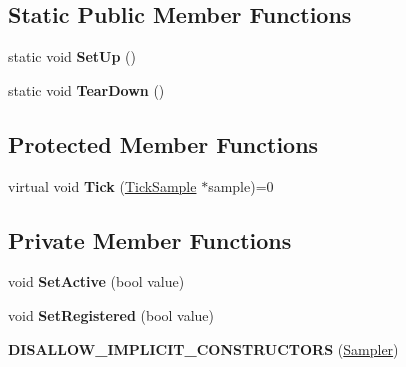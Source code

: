 \subsection*{Static Public Member Functions}
\begin{DoxyCompactItemize}
\item 
static void {\bfseries Set\+Up} ()\hypertarget{classv8_1_1internal_1_1_sampler_abba50ae6383b37c6033d9457ca0413c0}{}\label{classv8_1_1internal_1_1_sampler_abba50ae6383b37c6033d9457ca0413c0}

\item 
static void {\bfseries Tear\+Down} ()\hypertarget{classv8_1_1internal_1_1_sampler_ad5079e4708095bd40d857a46fe2880b6}{}\label{classv8_1_1internal_1_1_sampler_ad5079e4708095bd40d857a46fe2880b6}

\end{DoxyCompactItemize}
\subsection*{Protected Member Functions}
\begin{DoxyCompactItemize}
\item 
virtual void {\bfseries Tick} (\hyperlink{structv8_1_1internal_1_1_tick_sample}{Tick\+Sample} $\ast$sample)=0\hypertarget{classv8_1_1internal_1_1_sampler_a483bcf8623bba0a41f5d769291f9848f}{}\label{classv8_1_1internal_1_1_sampler_a483bcf8623bba0a41f5d769291f9848f}

\end{DoxyCompactItemize}
\subsection*{Private Member Functions}
\begin{DoxyCompactItemize}
\item 
void {\bfseries Set\+Active} (bool value)\hypertarget{classv8_1_1internal_1_1_sampler_a6918682dd75a5df2ea60c13e757b1870}{}\label{classv8_1_1internal_1_1_sampler_a6918682dd75a5df2ea60c13e757b1870}

\item 
void {\bfseries Set\+Registered} (bool value)\hypertarget{classv8_1_1internal_1_1_sampler_ae02eb4fc3c1b4ebe0c155ec3b094047c}{}\label{classv8_1_1internal_1_1_sampler_ae02eb4fc3c1b4ebe0c155ec3b094047c}

\item 
{\bfseries D\+I\+S\+A\+L\+L\+O\+W\+\_\+\+I\+M\+P\+L\+I\+C\+I\+T\+\_\+\+C\+O\+N\+S\+T\+R\+U\+C\+T\+O\+RS} (\hyperlink{classv8_1_1internal_1_1_sampler}{Sampler})\hypertarget{classv8_1_1internal_1_1_sampler_aa7249ede13597a0224414e7f29ba3bd5}{}\label{classv8_1_1internal_1_1_sampler_aa7249ede13597a0224414e7f29ba3bd5}

\end{DoxyCompactItemize}
